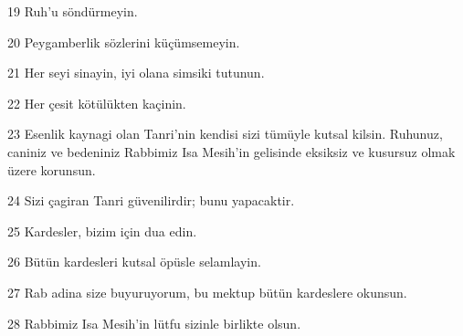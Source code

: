 \par 19 Ruh'u söndürmeyin.
\par 20 Peygamberlik sözlerini küçümsemeyin.
\par 21 Her seyi sinayin, iyi olana simsiki tutunun.
\par 22 Her çesit kötülükten kaçinin.
\par 23 Esenlik kaynagi olan Tanri'nin kendisi sizi tümüyle kutsal kilsin. Ruhunuz, caniniz ve bedeniniz Rabbimiz Isa Mesih'in gelisinde eksiksiz ve kusursuz olmak üzere korunsun.
\par 24 Sizi çagiran Tanri güvenilirdir; bunu yapacaktir.
\par 25 Kardesler, bizim için dua edin.
\par 26 Bütün kardesleri kutsal öpüsle selamlayin.
\par 27 Rab adina size buyuruyorum, bu mektup bütün kardeslere okunsun.
\par 28 Rabbimiz Isa Mesih'in lütfu sizinle birlikte olsun.


